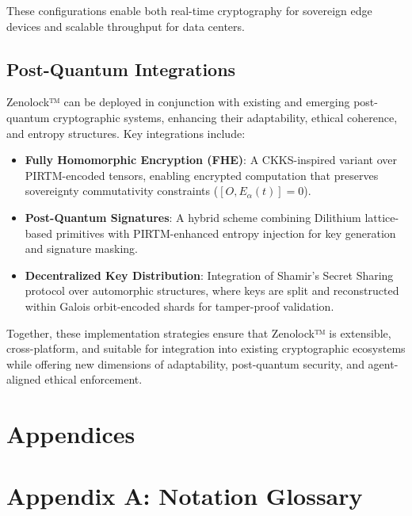 \documentclass{article}
\theoremstyle{plain}
\begin{document}
These configurations enable both real-time cryptography for sovereign edge devices and scalable throughput for data centers.

\subsection{Post-Quantum Integrations}

Zenolock™ can be deployed in conjunction with existing and emerging post-quantum cryptographic systems, enhancing their adaptability, ethical coherence, and entropy structures. Key integrations include:

\begin{itemize}
  \item \textbf{Fully Homomorphic Encryption (FHE)}: A CKKS-inspired variant over PIRTM-encoded tensors, enabling encrypted computation that preserves sovereignty commutativity constraints ($[O, E_\alpha(t)] = 0$).

  \item \textbf{Post-Quantum Signatures}: A hybrid scheme combining Dilithium lattice-based primitives with PIRTM-enhanced entropy injection for key generation and signature masking.

  \item \textbf{Decentralized Key Distribution}: Integration of Shamir’s Secret Sharing protocol over automorphic structures, where keys are split and reconstructed within Galois orbit-encoded shards for tamper-proof validation.
\end{itemize}

Together, these implementation strategies ensure that Zenolock™ is extensible, cross-platform, and suitable for integration into existing cryptographic ecosystems while offering new dimensions of adaptability, post-quantum security, and agent-aligned ethical enforcement.

\appendix

\section{Appendices}

\section{Appendix A: Notation Glossary}
\end{document}
